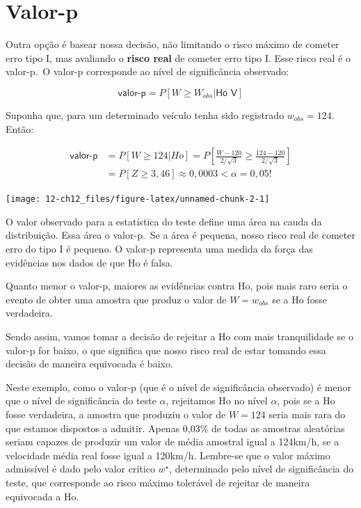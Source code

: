 \documentclass[
]{book}
\theoremstyle{definition}
\theoremstyle{definition}
\theoremstyle{definition}
\theoremstyle{remark}
\begin{document}
\hypertarget{valor-p}{%
\section{Valor-p}\label{valor-p}}

Outra opção é basear nossa decisão, não limitando o risco máximo de cometer erro tipo I, mas avaliando o \textbf{risco real} de cometer erro tipo I. Esse risco real é o valor-p.~O valor-p corresponde ao nível de significância observado:

\[\textsf{valor-p} = P[W \geq W_{obs} |\textsf{Ho V}]\]

Suponha que, para um determinado veículo tenha sido registrado \(w_{obs} = 124\).\\
Então:

\begin{align*}
    \textsf{valor-p} 
    &= P[W \geq 124 | Ho] = P\left[ \frac{W - 120}{2/\sqrt{3}} \geq \frac{124-120}{2/\sqrt{3}} \right]\\
    &= P[Z \geq 3,46] \approx 0,0003 < \alpha  = 0,05!
\end{align*}

\texttt{[image: 12-ch12\_files/figure-latex/unnamed-chunk-2-1]}

O valor observado para a estatística do teste define uma área na cauda da distribuição. Essa área o valor-p.~Se a área é pequena, nosso risco real de cometer erro do tipo I é pequeno. O valor-p representa uma medida da força das evidências nos dados de que Ho é falsa.

Quanto menor o valor-p, maiores as evidências contra Ho,
pois mais raro seria o evento de obter uma amostra que produz o valor de \(W = w_{obs}\) se a Ho fosse verdadeira.

Sendo assim, vamos tomar a decisão de rejeitar a Ho com mais tranquilidade se o valor-p for baixo, o que significa que nosso risco real de estar tomando essa decisão de maneira equivocada é baixo.

Neste exemplo, como o valor-p (que é o nível de significância observado) é menor que o nível de significância do teste \(\alpha\), rejeitamos Ho no nível \(\alpha\), pois se a Ho fosse verdadeira, a amostra que produziu o valor de \(W = 124\) seria mais rara do que estamos dispostos a admitir. Apenas 0,03\% de todas as amostras aleatórias seriam capazes de produzir um valor de média amostral igual a 124km/h, se a velocidade média real fosse igual a 120km/h. Lembre-se que o valor máximo admissível é dado pelo valor crítico \(w^\star\), determinado pelo nível de significância do teste, que corresponde ao risco máximo tolerável de rejeitar de maneira equivocada a Ho.
\end{document}

